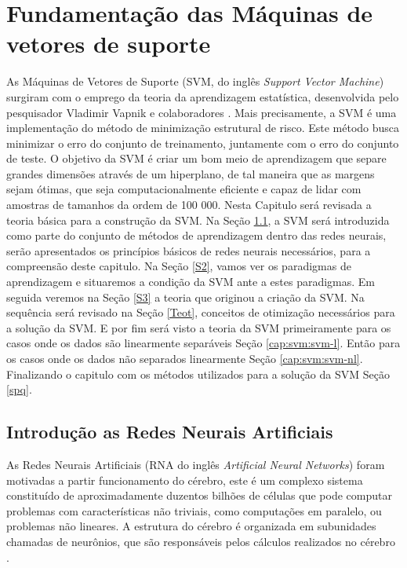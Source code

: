 \chapter{Fundamentação das Máquinas de vetores de suporte} \label{cap:svm}

As Máquinas de Vetores de Suporte (SVM, do inglês \textit{Support Vector Machine}) surgiram com o emprego da teoria da aprendizagem estatística, desenvolvida pelo pesquisador Vladimir Vapnik e colaboradores \cite{Vapnik1998}. Mais precisamente, a SVM é uma implementação do método de minimização estrutural de risco. Este método busca minimizar o erro do conjunto de treinamento, juntamente com o erro do conjunto de teste. O objetivo da SVM é criar um bom meio de aprendizagem que separe grandes dimensões através de um hiperplano, de tal maneira que as margens sejam ótimas, que seja computacionalmente eficiente e capaz de lidar com amostras de tamanhos da ordem de 100 000. Nesta Capitulo será revisada a teoria básica para a construção da SVM. Na Seção \ref{S1}, a SVM será introduzida como parte do conjunto de métodos de aprendizagem dentro das redes neurais, serão apresentados os princípios básicos de redes neurais necessários, para a compreensão deste capitulo. Na Seção \ref{S2}, vamos ver os paradigmas de aprendizagem e situaremos a condição da SVM ante a estes paradigmas. Em seguida veremos na Seção \ref{S3} a teoria que originou a criação da SVM. Na sequência será revisado na Seção \ref{Teot}, conceitos de otimização necessários para a solução da SVM. E por fim será visto a teoria da SVM primeiramente para os casos onde os dados são linearmente separáveis Seção \ref{cap:svm:svm-l}. Então para os casos onde os dados não separados linearmente Seção \ref{cap:svm:svm-nl}. Finalizando o capitulo com os métodos utilizados para a solução da SVM Seção \ref{spq}.

\section{Introdução as Redes Neurais Artificiais} \label{S1}
As Redes Neurais Artificiais (RNA do inglês \textit{Artificial Neural Networks}) foram motivadas a partir funcionamento do  cérebro, este é um complexo sistema constituído de aproximadamente duzentos bilhões de células que pode computar problemas com características não triviais, como computações em paralelo, ou problemas não lineares. A estrutura do cérebro é organizada em subunidades chamadas de neurônios, que são responsáveis pelos cálculos realizados no cérebro \cite{Haykin99}.

